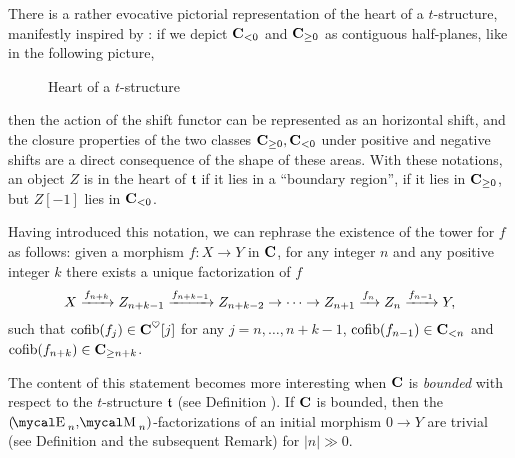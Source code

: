 \begin{remark}\label{evocative}
There is a rather evocative pictorial representation of the heart of a $t$\hyp{}structure, manifestly inspired by \cite{Brid}:
 if we depict $\textbf{C}_{<0}$ and $\textbf{C}_{\geq 0}$ as contiguous half\hyp{}planes, like in the following picture,
\begin{center}
\begin{figure}[H]
\caption{Heart of a $t$-structure}
\end{figure}
\end{center}
then the action of the shift functor can be represented as an horizontal shift, and the closure properties of the two classes $\textbf{C}_{\geq 0},\textbf{C}_{<0}$ under positive and negative shifts are a direct consequence of the shape of these areas. With these notations, an object $Z$ is in the heart of $\mathfrak{t}$ if it lies in a ``boundary region'', \ie if it lies in $\textbf{C}_{\geq 0}$, but $Z[-1]$ lies in $\textbf{C}_{<0}$.
\end{remark}
Having introduced this notation, we can rephrase the existence of the tower for $f$ as follows: given a morphism  $f\colon X\to Y$  in $\textbf{C}$, for any integer $n$ and any positive integer $k$ there exists a unique factorization of $f$ 
\[
X \xrightarrow{f_{n+k}} Z_{n+k-1} \xrightarrow{f_{n+k-1}}Z_{n+k-2}\to\dots\to Z_{n+1} \xrightarrow{f_{n}} Z_{n} \xrightarrow{f_{n-1}} Y,
\]
such that
$\text{cofib}(f_j)\in \textbf{C}^\heartsuit[j]$ for any $j=n,\dots,n+k-1$,  $\text{cofib}(f_{n-1})\in \textbf{C}_{<n}$  and $\text{cofib}(f_{n+k})\in \textbf{C}_{\geq n+k}$. 

The content of this statement becomes more interesting when $\textbf{C}$ is \emph{bounded} with respect to the $t$\hyp{}structure $\mathfrak{t}$ (see Definition ). If $\textbf{C}$ is bounded, then the $(\EE_n,\MM_n)$\hyp{}factorizations of an initial morphism $0\to Y$ are trivial (see Definition  and the subsequent Remark) for $|n|\gg 0$. 

